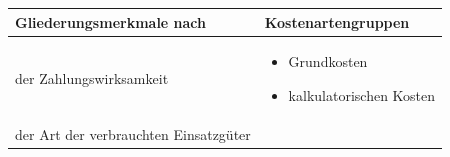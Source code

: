 \documentclass[a4paper]{article}
\newcommand\liststyleLSi{%
\renewcommand\labelitemi{${\bullet}$}
\renewcommand\labelitemii{${\circ}$}
\renewcommand\labelitemiii{${\blacksquare}$}
\renewcommand\labelitemiv{${\bullet}$}
}
\begin{document}
\bigskip


\bigskip

\begin{center}
\label{seq:refTable0}\tablefirsthead{}
\tablehead{}
\tabletail{}
\tablelasttail{}
\begin{supertabular}{|m{7.5360003cm}|m{7.563cm}|}
\hline
{\sffamily\bfseries\color{black} Gliederungsmerkmale nach} &
{\sffamily\bfseries\color{black} Kostenartengruppen}\\\hline
{\sffamily\color{black} der Zahlungswirksamkeit} &
\liststyleLSi
\begin{itemize}
\item {\sffamily\color{black} Grundkosten}
\item {\sffamily\color{black} kalkulatorischen Kosten}
\end{itemize}
\\\hline
{\sffamily\color{black} der Art der verbrauchten Einsatzgüter}


\end{supertabular}
\end{center}
\end{document}
